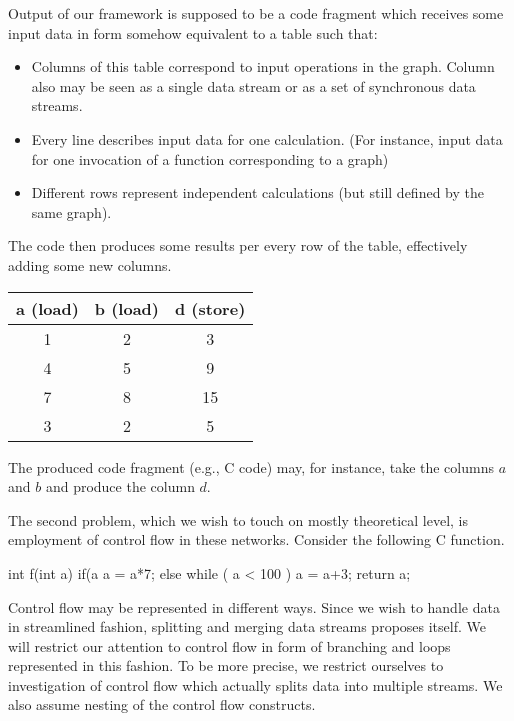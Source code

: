 Output of our framework is supposed to be a code fragment which receives some input data in form somehow equivalent to a table such that:
\begin{itemize}
  \item Columns of this table correspond to input operations in the graph. Column also may be seen as a single data stream or as a set of synchronous data streams. 
  \item Every line describes input data for one calculation. (For instance, input data for one invocation of a function corresponding to a graph)
  \item Different rows represent independent calculations (but still defined by the same graph). 
\end{itemize}
The code then produces some results per every row of the table, effectively adding some new columns.

\begin{center}
  \begin{tabular}{c|c||c}
    a (load)&b (load)&d (store)\\
  \hline
  1&2&3\\
  4&5&9\\
  7&8&15\\
  3&2&5\\
  \end{tabular}
\end{center}

The produced code fragment (e.g., C code) may, for instance, take the columns $a$ and $b$ and produce the column $d$. 


The second problem, which we wish to touch on mostly theoretical level, is employment of control flow in these networks. Consider the following C function. 

\begin{code}
int f(int a)
{
  if(a %
    a = a*7;
  else
    while ( a < 100 )
      a = a+3;
  return a;
}
\end{code}

Control flow may be represented in different ways. Since we wish to handle data in streamlined fashion, splitting and merging data streams proposes itself. We will restrict our attention to control flow in form of branching and loops represented in this fashion. To be more precise, we restrict ourselves to investigation of control flow which actually splits data into multiple streams. We also assume nesting of the control flow constructs.


